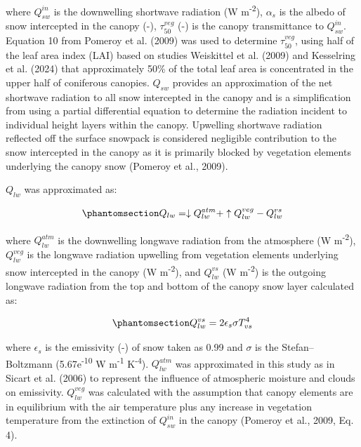 \documentclass[
  letterpaper,
]{tex/uofsthesis-cs}
\begin{document}
where \(Q_{sw}^{in}\) is the downwelling shortwave radiation (W
m\textsuperscript{-2}), \(\alpha_s\) is the albedo of snow intercepted
in the canopy (-), \(\tau_{50}^{veg}\) (-) is the canopy transmittance
to \(Q_{sw}^{in}\). Equation 10 from Pomeroy et al. (2009) was used to
determine \(\tau_{50}^{veg}\), using half of the leaf area index (LAI)
based on studies Weiskittel et al. (2009) and Kesselring et al. (2024)
that approximately 50\% of the total leaf area is concentrated in the
upper half of coniferous canopies. \(Q_{sw}\) provides an approximation
of the net shortwave radiation to all snow intercepted in the canopy and
is a simplification from using a partial differential equation to
determine the radiation incident to individual height layers within the
canopy. Upwelling shortwave radiation reflected off the surface snowpack
is considered negligible contribution to the snow intercepted in the
canopy as it is primarily blocked by vegetation elements underlying the
canopy snow (Pomeroy et al., 2009).

\(Q_{lw}\) was approximated as:

\begin{equation}\phantomsection\label{eq-lw}{
Q_{lw} = \downarrow Q_{lw}^{atm} + \uparrow Q_{lw}^{veg} - Q_{lw}^{vs}
}\end{equation}

where \(Q_{lw}^{atm}\) is the downwelling longwave radiation from the
atmosphere (W m\textsuperscript{-2}), \(Q_{lw}^{veg}\) is the longwave
radiation upwelling from vegetation elements underlying snow intercepted
in the canopy (W m\textsuperscript{-2}), and \(Q_{lw}^{vs}\) (W
m\textsuperscript{-2}) is the outgoing longwave radiation from the top
and bottom of the canopy snow layer calculated as:

\begin{equation}\phantomsection\label{eq-lw-vs}{
Q_{lw}^{vs} = 2 \epsilon_{s} \sigma T_{vs}^4
}\end{equation}

where \(\epsilon_s\) is the emissivity (-) of snow taken as 0.99 and
\(\sigma\) is the Stefan--Boltzmann (5.67e\textsuperscript{-10} W
m\textsuperscript{-1} K\textsuperscript{-4}). \(Q_{lw}^{atm}\) was
approximated in this study as in Sicart et al. (2006) to represent the
influence of atmospheric moisture and clouds on emissivity.
\(Q_{lw}^{veg}\) was calculated with the assumption that canopy elements
are in equilibrium with the air temperature plus any increase in
vegetation temperature from the extinction of \(Q_{sw}^{in}\) in the
canopy (Pomeroy et al., 2009, Eq. 4).
\end{document}
